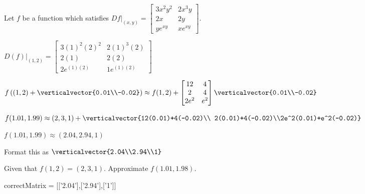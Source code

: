 \documentclass{ximera}
\begin{document}
\begin{question} 
	Let $f$ be a function which satisfies $Df\big|_{(x,y)} = \begin{bmatrix} 3x^2y^2 & 2x^3y\\ 2x&2y\\ye^{xy} & xe^{xy}\end{bmatrix}$.
	
		\begin{solution}
			\begin{hint}
				\(D(f)\big|_{(1,2)} = \begin{bmatrix} 3(1)^2(2)^2 & 2(1)^3(2)\\ 2(1) & 2(2) \\ 2e^{(1)(2)} & 1e^{(1)(2)}\end{bmatrix}\)
			\end{hint}
			\begin{hint}
				\( f\left((1,2)+ \verticalvector{0.01\\-0.02}\right)\approx f(1,2) + 
				\begin{bmatrix} 12 & 4\\2 & 4 \\ 2e^{2} & e^{2}\end{bmatrix} \verticalvector{0.01\\-0.02}\)
			\end{hint}
			\begin{hint}
				\( f(1.01,1.99) \approx (2,3,1)+ \verticalvector{12(0.01)+4(-0.02)\\ 2(0.01)+4(-0.02)\\2e^2(0.01)+e^2(-0.02)}\)
			\end{hint}
			\begin{hint}
				\( f(1.01,1.99) \approx (2.04,2.94,1)\)
			\end{hint}
			\begin{hint}
				Format this as $\verticalvector{2.04\\2.94\\1}$
			\end{hint}
			Given that \(f(1,2) = (2,3,1)\).  Approximate \(f(1.01,1.98)\).  
			\begin{matrix-answer}
				correctMatrix = [['2.04'],['2.94'],['1']]
			\end{matrix-answer}
		\end{solution}
\end{question}




	
\end{document}
